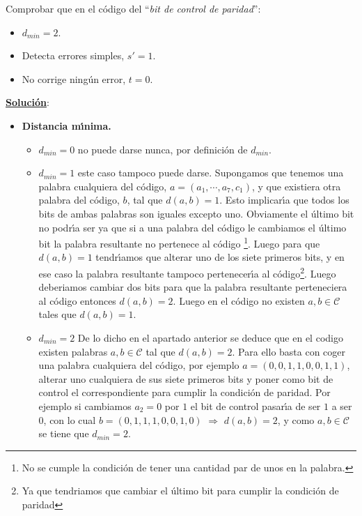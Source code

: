 %
%
\begin{ejercicio}
Comprobar que en el c\'odigo del ``\emph{bit de control de paridad}'':
\begin{itemize}
\item $d_{min}=2$.
\item Detecta errores simples, $s'=1$.
\item No corrige ning\'un error, $t=0$.
\end{itemize}
\end{ejercicio}
\underline{\textbf{Soluci\'on}}:
\begin{itemize}
\item \textbf{Distancia m\'{\i}nima.}
\begin{itemize}
\item $d_{min}=0$ no puede darse nunca, por definici\'on de $d_{min}$.
\item $d_{min}=1$ este caso tampoco puede darse. Supongamos que tenemos una
palabra cualquiera del c\'odigo, $a=(a_1,\cdots,a_7,c_1)$, y que existiera 
otra palabra del c\'odigo, $b$, tal que $d(a,b) = 1$. Esto implicar\'{\i}a que
todos los bits de ambas palabras son iguales excepto uno. Obviamente el
\'ultimo bit no podr\'{\i}a ser ya que si a una palabra del c\'odigo le
cambiamos el \'ultimo bit la palabra resultante no pertenece al c\'odigo%
\footnote{No se cumple la condici\'on de tener una cantidad par de unos en
la palabra.}. Luego para que $d(a,b)=1$ tendr\'{\i}amos que alterar uno de
los siete primeros bits, y en ese caso la palabra resultante tampoco 
pertenecer\'{\i}a al c\'odigo\footnote{Ya que tendriamos que cambiar el
\'ultimo bit para cumplir la condici\'on de paridad}. Luego deberiamos cambiar
dos bits para que la palabra resultante perteneciera al c\'odigo entonces
$d(a,b)=2$. Luego en el c\'odigo no existen $a,b\in \mathcal{C}$ tales que
$d(a,b)=1$.
\item $d_{min}=2$ De lo dicho en el apartado anterior se deduce que en el 
codigo existen palabras $a,b\in \mathcal{C}$ tal que $d(a,b)=2$. Para ello
basta con coger una palabra cualquiera del c\'odigo, por ejemplo
$a=(0,0,1,1,0,0,1,1)$, alterar uno cualquiera de sus siete primeros bits y
poner como bit de control el correspondiente para cumplir la condici\'on de
paridad. Por ejemplo si cambiamos $a_2=0$ por $1$ el bit de control
pasar\'{\i}a de ser $1$ a ser $0$, con lo cual $b=(0,1,1,1,0,0,1,0)$
$\Longrightarrow$ $d(a,b)=2$, y como $a,b\in \mathcal{C}$ se tiene que 
$d_{min}=2$.

\end{itemize}
\end{itemize}
